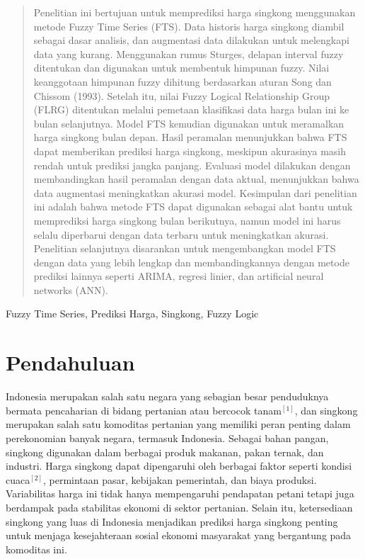 \documentclass[conference]{IEEEtran}
\renewcommand{\headrulewidth}{0pt}
\renewcommand{\footrulewidth}{0.5pt}
\begin{document}
\begin{abstract}
    Penelitian ini bertujuan untuk memprediksi harga singkong menggunakan metode Fuzzy Time Series (FTS). Data historis harga singkong diambil sebagai dasar analisis, dan augmentasi data dilakukan untuk melengkapi data yang kurang. Menggunakan rumus Sturges, delapan interval fuzzy ditentukan dan digunakan untuk membentuk himpunan fuzzy. Nilai keanggotaan himpunan fuzzy dihitung berdasarkan aturan Song dan Chissom (1993). Setelah itu, nilai Fuzzy Logical Relationship Group (FLRG) ditentukan melalui pemetaan klasifikasi data harga bulan ini ke bulan selanjutnya. Model FTS kemudian digunakan untuk meramalkan harga singkong bulan depan. Hasil peramalan menunjukkan bahwa FTS dapat memberikan prediksi harga singkong, meskipun akurasinya masih rendah untuk prediksi jangka panjang. Evaluasi model dilakukan dengan membandingkan hasil peramalan dengan data aktual, menunjukkan bahwa data augmentasi meningkatkan akurasi model. Kesimpulan dari penelitian ini adalah bahwa metode FTS dapat digunakan sebagai alat bantu untuk memprediksi harga singkong bulan berikutnya, namun model ini harus selalu diperbarui dengan data terbaru untuk meningkatkan akurasi. Penelitian selanjutnya disarankan untuk mengembangkan model FTS dengan data yang lebih lengkap dan membandingkannya dengan metode prediksi lainnya seperti ARIMA, regresi linier, dan artificial neural networks (ANN).
\end{abstract}

\begin{IEEEkeywords}
Fuzzy Time Series, Prediksi Harga, Singkong, Fuzzy Logic
\end{IEEEkeywords}

\thispagestyle{fancy}
\fancyhf{}
\fancyfoot[C]{\thepage}
\renewcommand{\headrulewidth}{0pt}
\renewcommand{\footrulewidth}{0.5pt}
\section{Pendahuluan}
Indonesia merupakan salah satu negara yang sebagian besar penduduknya bermata pencaharian di bidang pertanian atau bercocok tanam$^{[1]}$, dan singkong merupakan salah satu komoditas pertanian yang memiliki peran penting dalam perekonomian banyak negara, termasuk Indonesia. Sebagai bahan pangan, singkong digunakan dalam berbagai produk makanan, pakan ternak, dan industri.  Harga singkong dapat dipengaruhi oleh berbagai faktor seperti kondisi cuaca$^{[2]}$, permintaan pasar, kebijakan pemerintah, dan biaya produksi. Variabilitas harga ini tidak hanya mempengaruhi pendapatan petani tetapi juga berdampak pada stabilitas ekonomi di sektor pertanian. Selain itu, ketersediaan singkong yang luas di Indonesia menjadikan prediksi harga singkong penting untuk menjaga kesejahteraan sosial ekonomi masyarakat yang bergantung pada komoditas ini.
\end{document}
